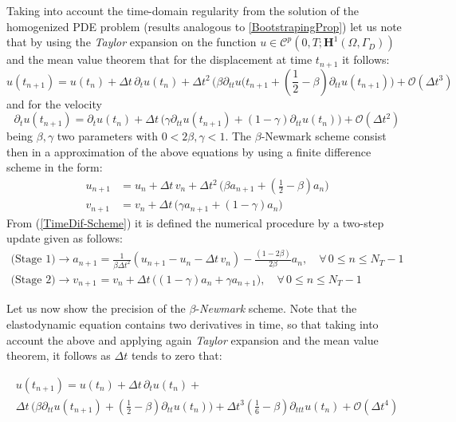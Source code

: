 Taking into account the time-domain regularity from the solution of the homogenized PDE problem (results analogous to \ref{BootstrapingProp}) let us note that by using the \textit{Taylor} expansion on the function $u \in \mathcal{C}^{p}(0,T;\mathbf{H}^1(\Omega, \Gamma_D))$ and the mean value theorem that for the displacement at time $t_{n+1}$ it follows:
\begin{equation*}
    u(t_{n+1}) = u(t_n) + \Delta t \, \partial_{t} u(t_n) + \Delta t^2 \, \big( \beta \partial_{tt} u(t_{n+1} + (\frac{1}{2} - \beta) \partial_{tt} u(t_{n+1}) \big) + \mathcal{O}(\Delta t^3)    
\end{equation*}
and for the velocity
\begin{equation*}
    \partial_{t} u(t_{n+1}) = \partial_{t} u (t_{n}) + \Delta t \, \big( \gamma \partial_{tt} u(t_{n+1}) + (1-\gamma) \partial_{tt} u(t_n) \big) + \mathcal{O}(\Delta t^2)
\end{equation*}
being $\beta, \gamma$ two parameters with $0 < 2\beta, \gamma < 1$.
The $\beta$-Newmark scheme consist then in a approximation of the above equations by using a finite difference scheme in the form:
\begin{align}
    \label{TimeDif-Scheme}
    u_{n+1} &= u_{n} + \Delta t\, v_{n} + \Delta t^2 \, \big( \beta a_{n+1} + (\frac{1}{2} - \beta) a_n \big) \\
    v_{n+1} &= v_n + \Delta t\, \big( \gamma a_{n+1} + (1-\gamma) a_{n} \big)
\end{align}
From (\ref{TimeDif-Scheme}) it is defined the numerical procedure by a two-step update given as follows:
\begin{align}
    \label{TwoStage-Update}
    \text{(Stage 1)}\longrightarrow  a_{n+1} &= \frac{1}{\beta \Delta t^2} ( u_{n+1}-u_n - \Delta t \, v_n) - \frac{(1-2\beta)}{2 \beta} a_n, \quad \forall \, 0 \leq n \leq N_T-1 \\
    \text{(Stage 2)}\longrightarrow v_{n+1} &= v_n + \Delta t \, \big( (1-\gamma) a_n + \gamma a_{n+1} \big), \quad \forall \, 0 \leq n \leq N_T-1
\end{align}

Let us now show the precision of the $\beta$-\textit{Newmark} scheme. Note that the elastodynamic equation contains two derivatives in time, so that taking into account the above and applying again \textit{Taylor} expansion and the mean value theorem, it follows as $\Delta t$ tends to zero that:

\begin{multline}
    u(t_{n+1}) = u(t_{n}) + \Delta t \, \partial_{t} u(t_n) + \\
    \Delta t \, \big( \beta \partial_{tt} u(t_{n+1}) + (\frac{1}{2}- \beta) \partial_{tt} u(t_n) \big) + \Delta t^3 (\frac{1}{6}-\beta) \partial_{ttt}u(t_n) + \mathcal{O}(\Delta t^4)
\end{multline}

